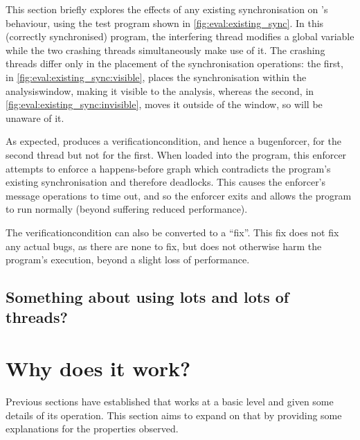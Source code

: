 \noindent
This section briefly explores the effects of any existing
synchronisation on {\technique}'s behaviour, using the test program
shown in \autoref{fig:eval:existing_sync}.  In this (correctly
synchronised) program, the interfering thread modifies a global
variable while the two crashing threads simultaneously make use of it.
The crashing threads differ only in the placement of the
synchronisation operations: the first, in
\autoref{fig:eval:existing_sync:visible}, places the synchronisation
within the \gls{analysiswindow}, making it visible to the {\technique}
analysis, whereas the second, in
\autoref{fig:eval:existing_sync:invisible}, moves it outside of the
window, so {\technique} will be unaware of it.

As expected, {\technique} produces a \gls{verificationcondition}, and
hence a \gls{bugenforcer}, for the second thread but not for the
first.  When loaded into the program, this enforcer attempts to
enforce a happens-before graph which contradicts the program's
existing synchronisation and therefore deadlocks.  This causes the
enforcer's message operations to time out, and so the enforcer exits
and allows the program to run normally (beyond suffering reduced
performance).

The \gls{verificationcondition} can also be converted to a ``fix''.
This fix does not fix any actual bugs, as there are none to fix, but
does not otherwise harm the program's execution, beyond a slight loss
of performance.

\subsection{Something about using lots and lots of threads?}

\section{Why does it work?}
\label{sect:eval:why_does_it_work}

Previous sections have established that {\technique} works at a basic
level and given some details of its operation.  This section aims to
expand on that by providing some explanations for the properties
observed.


